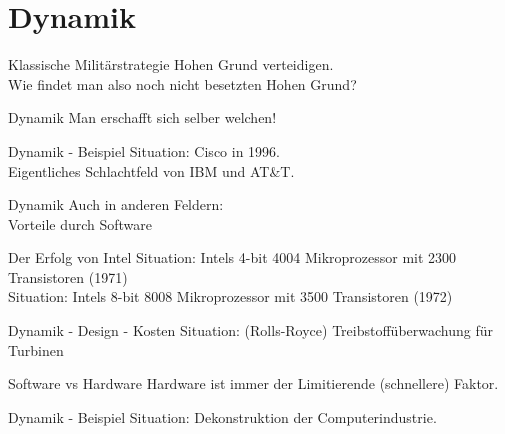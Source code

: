 \section{Dynamik}


\begin{frame}[c]{Klassische Militärstrategie}
    \Large
    Hohen Grund verteidigen. \\ \pause
    Wie findet man also noch nicht besetzten Hohen Grund?
\end{frame}


\begin{frame}[c]{Dynamik}
    \Large
    Man erschafft sich selber welchen!
\end{frame}


\begin{frame}[c]{Dynamik - Beispiel}
    \Large
    Situation: Cisco in 1996. \\
    Eigentliches Schlachtfeld von IBM und AT\&T.
\end{frame}


\begin{frame}[c]{Dynamik}
    \Large
    Auch in anderen Feldern: \\
    Vorteile durch Software
\end{frame}



\begin{frame}[c]{Der Erfolg von Intel}
    \Large
    Situation: Intels 4-bit 4004 Mikroprozessor mit 2300 Transistoren (1971) \\ \pause
    Situation: Intels 8-bit 8008 Mikroprozessor mit 3500 Transistoren (1972)
\end{frame}


\begin{frame}[c]{Dynamik - Design - Kosten}
    \Large
    Situation: (Rolls-Royce) Treibstoffüberwachung für Turbinen
\end{frame}


\begin{frame}[c]{Software vs Hardware}
    \Large
    Hardware ist immer der Limitierende (schnellere) Faktor.
\end{frame}


\begin{frame}[c]{Dynamik - Beispiel}
    \Large
    Situation: Dekonstruktion der Computerindustrie.
\end{frame}


